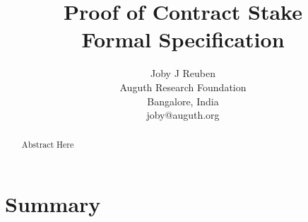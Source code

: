 \documentclass{article}
\begin{document}
\title{Proof of Contract Stake \\ Formal Specification}

\author{Joby J Reuben \\
Auguth Research Foundation \\
Bangalore, India \\
joby@auguth.org
}

\maketitle

\begin{abstract}
Abstract Here
\end{abstract}
\section{Summary} \label{Summary}
\end{document}
